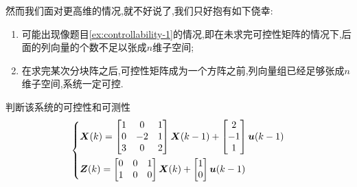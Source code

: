 \documentclass[cn,10pt,citestyle=gb7714-2015,bibstyle=gb7714-2015]{elegantbook}
\begin{document}
然而我们面对更高维的情况,就不好说了,我们只好抱有如下侥幸:
\begin{enumerate}
  \item 可能出现像题目\ref{ex:controllability-1}的情况,即在未求完可控性矩阵的情况下,后面的列向量的个数不足以张成$n$维子空间;
  \item 在求完某次分块阵之后,可控性矩阵成为一个方阵之前,列向量组已经足够张成$n$维子空间,系统一定可控.
\end{enumerate}
\begin{example}
  判断该系统的可控性和可测性
  \[
    \begin{dcases}
      \bm{X}(k)=\begin{bmatrix}
        1&0&1\\
        0&-2&1\\
        3&0&2
      \end{bmatrix}\bm{X}(k-1)+\begin{bmatrix}
        2\\
        -1\\
        1
      \end{bmatrix}\bm{u}(k-1)\\
      \bm{Z}(k)=\begin{bmatrix}
        0&0&1\\
        1&0&0
      \end{bmatrix}\bm{X}(k)+\begin{bmatrix}
        1\\
        0
      \end{bmatrix}\bm{u}(k-1)
    \end{dcases}
  \]
\end{example}
\end{document}
